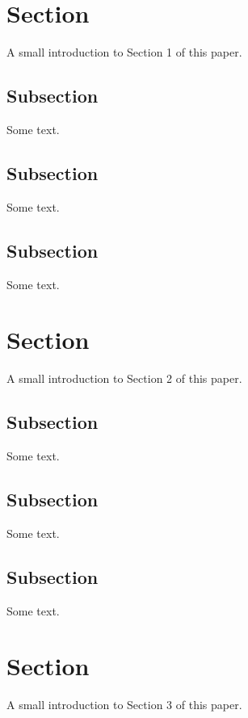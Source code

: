 \documentclass{article}[12]
\newcommand{\thisWillProbablyChange}{A small introduction to Section }
\begin{document}
\begin{center}
	\vspace*{\fill}
	\tableofcontents
	\vspace*{\fill}
\end{center}
\newpage
\section{Section}
	\thisWillProbablyChange 1 of this paper. \cite{First Fake Source}
	\subsection{Subsection}
	Some text.
	\subsection{Subsection}
	Some text.
	\subsection{Subsection}
	Some text.
\section{Section}
	\thisWillProbablyChange 2 of this paper. \cite{Second Fake Source}
	\subsection{Subsection}
	Some text.
	\subsection{Subsection}
	Some text.
	\subsection{Subsection}
	Some text.
\section{Section}
	\thisWillProbablyChange 3 of this paper. \cite{Third Fake Source}
\end{document}
